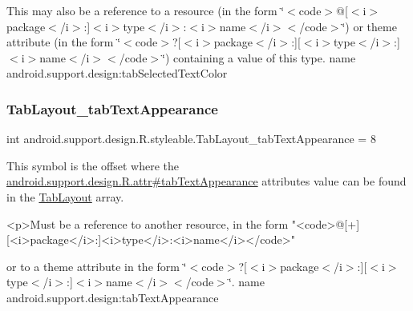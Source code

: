 This may also be a reference to a resource (in the form \char`\"{}$<$code$>$@\mbox{[}$<$i$>$package$<$/i$>$\+:\mbox{]}$<$i$>$type$<$/i$>$\+:$<$i$>$name$<$/i$>$$<$/code$>$\char`\"{}) or theme attribute (in the form \char`\"{}$<$code$>$?\mbox{[}$<$i$>$package$<$/i$>$\+:\mbox{]}\mbox{[}$<$i$>$type$<$/i$>$\+:\mbox{]}$<$i$>$name$<$/i$>$$<$/code$>$\char`\"{}) containing a value of this type.  name android.\+support.\+design\+:tab\+Selected\+Text\+Color \mbox{\label{classandroid_1_1support_1_1design_1_1R_1_1styleable_a79348bc9ddfecdbdc92dcc36d85832b2}} 
\subsubsection{\texorpdfstring{Tab\+Layout\+\_\+tab\+Text\+Appearance}{TabLayout\_tabTextAppearance}}
{\footnotesize\ttfamily int android.\+support.\+design.\+R.\+styleable.\+Tab\+Layout\+\_\+tab\+Text\+Appearance = 8\hspace{0.3cm}{\ttfamily [static]}}

This symbol is the offset where the \hyperlink{classandroid_1_1support_1_1design_1_1R_1_1attr_a9f7da107b74efc58026aa10f8acfd26c}{android.\+support.\+design.\+R.\+attr\#tab\+Text\+Appearance} attribute\textquotesingle{}s value can be found in the \hyperlink{classandroid_1_1support_1_1design_1_1R_1_1styleable_a514b47b47f600f9421b65f4f0aa832d6}{Tab\+Layout} array.

\begin{DoxyVerb}      <p>Must be a reference to another resource, in the form "<code>@[+][<i>package</i>:]<i>type</i>:<i>name</i></code>"
\end{DoxyVerb}
 or to a theme attribute in the form \char`\"{}$<$code$>$?\mbox{[}$<$i$>$package$<$/i$>$\+:\mbox{]}\mbox{[}$<$i$>$type$<$/i$>$\+:\mbox{]}$<$i$>$name$<$/i$>$$<$/code$>$\char`\"{}.  name android.\+support.\+design\+:tab\+Text\+Appearance \mbox{\label{classandroid_1_1support_1_1design_1_1R_1_1styleable_afae09ccec67f90fecb5707a8dd509451}} 
